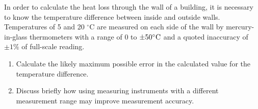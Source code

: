 \documentclass[a4paper,11pt]{book}
\begin{document}
\begin{question}
In order to calculate the heat loss through the wall of a building, it is necessary to know the temperature difference between inside and outside walls. Temperatures of 5 and 20 $^{\circ}$C are measured on each side of the wall by mercury-in-glass thermometers with a range of 0 to $\rm \pm 50^{\circ}C$ and a quoted inaccuracy of $\pm 1\%$ of full-scale reading.
\begin{enumerate}
\item Calculate the likely maximum possible error in the calculated value for the temperature difference.
\item Discuss briefly how using measuring instruments with a different measurement range may improve measurement accuracy.
\end{enumerate}
\examspace*{10em}

\end{question}
\begin{solution}


\end{solution}
\end{document}
